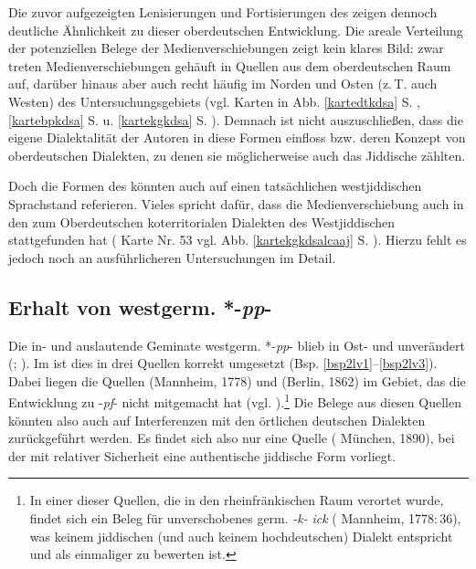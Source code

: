  Die zuvor aufgezeigten Lenisierungen und Fortisierungen des  zeigen dennoch deutliche Ähnlichkeit zu dieser oberdeutschen Entwicklung. Die areale Verteilung der potenziellen Belege der Medienverschiebungen zeigt kein klares Bild: zwar treten Medienverschiebungen gehäuft in Quellen aus dem oberdeutschen Raum auf, darüber hinaus aber auch recht häufig im Norden und Osten (z.\,T. auch Westen) des Untersuchungsgebiets (vgl. Karten in Abb. \ref{kartedtkdsa} S. \pageref{kartedtkdsa}, \ref{kartebpkdsa} S. \pageref{kartebpkdsa} u. \ref{kartekgkdsa} S. \pageref{kartekgkdsa}). Demnach ist nicht auszuschließen, dass die eigene Dialektalität der Autoren in diese Formen einfloss bzw. deren Konzept von oberdeutschen Dialekten, zu denen sie möglicherweise auch das Jiddische zählten.
 
 Doch die Formen des  könnten auch auf einen tatsächlichen westjiddischen Sprachstand referieren. Vieles spricht dafür, dass die Medienverschiebung auch in den zum Oberdeutschen koterritorialen Dialekten des Westjiddischen stattgefunden hat ( Karte Nr. 53 vgl. Abb. \ref{kartekgkdsalcaaj} S. \pageref{kartekgkdsalcaaj}). Hierzu fehlt es jedoch noch an ausführlicheren Untersuchungen im Detail.\\
  

  
  \subsection{Erhalt von westgerm. *-\textit{pp}-}
Die in- und auslautende Geminate westgerm. *-\textit{pp}- blieb in Ost- und  unverändert (\cite[189]{Kleine2008}; \cite[323–327]{Bin-Nun1973}). Im  ist dies in drei Quellen korrekt umgesetzt (Bsp. \ref{bsp2lv1}–\ref{bsp2lv3}). Dabei liegen die Quellen  (Mannheim, 1778) und  (Berlin, 1862) im Gebiet, das die Entwicklung zu -\textit{pf}- nicht mitgemacht hat (vgl. \cite[64f]{Koenig1978}).\footnote{In einer dieser Quellen, die in den rheinfränkischen Raum verortet wurde, findet sich ein Beleg für unverschobenes germ. \textit{-k-} \textit{ick}  ( Mannheim, 1778:\,36), was keinem jiddischen (und auch keinem hochdeutschen) Dialekt entspricht und als einmaliger  zu bewerten ist.} Die Belege aus diesen Quellen könnten also auch auf Interferenzen mit den örtlichen deutschen Dialekten zurückgeführt werden. Es findet sich also nur eine Quelle ( München, 1890), bei der mit relativer Sicherheit eine authentische jiddische Form vorliegt.\\
  
